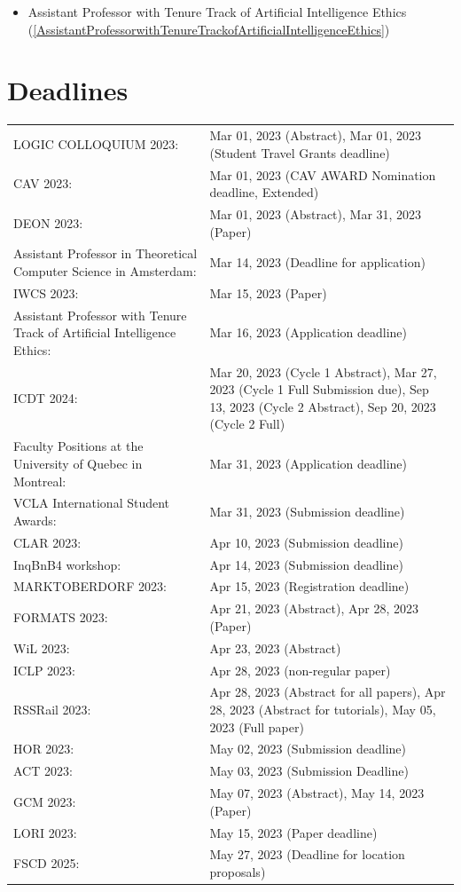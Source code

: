 \documentclass[prodmode,acmtecs]{acmsmall} %
\begin{document}
\begin{itemize}
\begin{itemize}\item Assistant Professor with Tenure Track of Artificial Intelligence Ethics (\cref{AssistantProfessorwithTenureTrackofArtificialIntelligenceEthics})
\end{itemize} 
\end{itemize}\section{Deadlines}\label{deadlines}\begin{tabulary}{\linewidth}{LL}LOGIC COLLOQUIUM 2023:  & Mar 01, 2023 (Abstract), Mar 01, 2023 (Student Travel Grants deadline) \\
CAV 2023:  & Mar 01, 2023 (CAV AWARD Nomination deadline, Extended) \\
DEON 2023:  & Mar 01, 2023 (Abstract), Mar 31, 2023 (Paper) \\
Assistant Professor in Theoretical Computer Science in Amsterdam:  & Mar 14, 2023 (Deadline for application) \\
IWCS 2023:  & Mar 15, 2023 (Paper) \\
Assistant Professor with Tenure Track of Artificial Intelligence Ethics:  & Mar 16, 2023 (Application deadline) \\
ICDT 2024:  & Mar 20, 2023 (Cycle 1 Abstract), Mar 27, 2023 (Cycle 1 Full Submission due), Sep 13, 2023 (Cycle 2 Abstract), Sep 20, 2023 (Cycle 2 Full) \\
Faculty Positions at the University of Quebec in Montreal:  & Mar 31, 2023 (Application deadline) \\
VCLA International Student Awards:  & Mar 31, 2023 (Submission deadline) \\
CLAR 2023:  & Apr 10, 2023 (Submission deadline) \\
InqBnB4 workshop:  & Apr 14, 2023 (Submission deadline) \\
MARKTOBERDORF 2023:  & Apr 15, 2023 (Registration deadline) \\
FORMATS 2023:  & Apr 21, 2023 (Abstract), Apr 28, 2023 (Paper) \\
WiL 2023:  & Apr 23, 2023 (Abstract) \\
ICLP 2023:  & Apr 28, 2023 (non-regular paper) \\
RSSRail 2023:  & Apr 28, 2023 (Abstract  for all papers), Apr 28, 2023 (Abstract  for tutorials), May 05, 2023 (Full paper) \\
HOR 2023:  & May 02, 2023 (Submission deadline) \\
ACT 2023:  & May 03, 2023 (Submission Deadline) \\
GCM 2023:  & May 07, 2023 (Abstract), May 14, 2023 (Paper) \\
LORI 2023:  & May 15, 2023 (Paper  deadline) \\
FSCD 2025:  & May 27, 2023 (Deadline for location proposals) \\
\end{tabulary}
\end{document}
